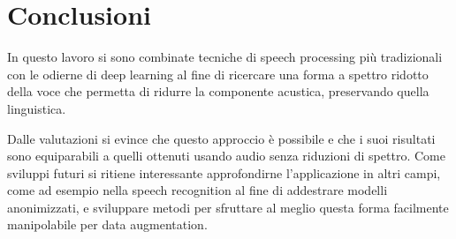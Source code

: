 \chapter{Conclusioni}
	In questo lavoro si sono combinate tecniche di speech processing più tradizionali con le odierne di deep learning al fine di ricercare una forma a spettro ridotto della voce che permetta di ridurre la componente acustica, preservando quella linguistica.
	
	Dalle valutazioni si evince che questo approccio è possibile e che i suoi risultati sono equiparabili a quelli ottenuti usando audio senza riduzioni di spettro. Come sviluppi futuri si ritiene interessante approfondirne l'applicazione in altri campi, come ad esempio nella speech recognition al fine di addestrare modelli anonimizzati, e sviluppare metodi per sfruttare al meglio questa forma facilmente manipolabile per data augmentation.
	